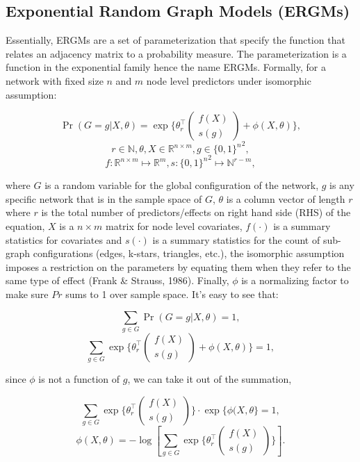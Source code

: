 \documentclass[11pt]{article}
\begin{document}
\subsection{Exponential Random Graph Models (ERGMs)}
Essentially, ERGMs are a set of parameterization that specify the function that relates an adjacency matrix to a probability measure. The parameterization is a function in the exponential family hence the name ERGMs. Formally, for a network with fixed size $n$ and $m$ node level predictors under isomorphic assumption:


$$\Pr(G=g|X,\theta) = \exp\{ \theta_r^\intercal 
\begin{pmatrix} f(X)\\s(g) \end{pmatrix} + \phi(X,\theta)\}, $$
$$r \in \mathbb{N}, \theta,X \in \mathbb{R}^{n \times m}, g \in {\{0,1\}^n}^{2},$$
$$f: \mathbb{R}^{n\times m} \mapsto \mathbb{R}^m, s: {\{0,1\}^n}^{2} \mapsto 
\mathbb{N}^{r-m},$$

where $G$ is a random variable for the global configuration of the network, $g$ is any specific network that is in the sample space of $G$, $\theta$ is a column vector of length $r$ where $r$ is the total number of predictors/effects on right hand side (RHS) of the equation, $X$ is a $n \times m$ matrix for node level covariates, $f(\cdot)$ is a summary statistics for covariates and $s(\cdot)$ is a summary statistics for the count of sub-graph configurations (edges, k-stars, triangles, etc.), the isomorphic assumption imposes a restriction on the parameters by equating them when they refer to the same type of effect (Frank \& Strauss, 1986). Finally, $\phi$ is a normalizing factor to make sure $Pr$ sums to 1 over sample space. It's easy to see that: 
 

$$\sum_{g \in G} \Pr (G=g|X,\theta)=1,$$
$$\sum_{g \in G}  \exp\{ \theta_r^\intercal 
\begin{pmatrix} f(X)\\s(g) \end{pmatrix} + \phi(X,\theta)\}=1,$$

since $\phi$ is not a function of $g$, we can take it out of the summation,

$$\sum_{g \in G} \exp\{ \theta_r^\intercal 
\begin{pmatrix} f(X)\\s(g) \end{pmatrix}\} \cdot \exp\{\phi(X,\theta\} = 1,$$ 
$$\phi(X,\theta) = - \log[\sum_{g \in G}  \exp\{ \theta_r^\intercal 
\begin{pmatrix} f(X)\\s(g) \end{pmatrix}\}]. $$
\end{document}
